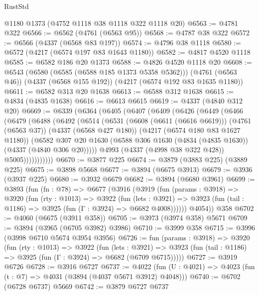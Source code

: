 \begin{lexlean}{RustStd}
\begin{coremodule}
{\begin{coremodule}
{{{{{{{{{{{{{{{{{{{{{{{{{{{{{{{{    @1180
    @1373
    (@4752 @1118 @38 @1118 @322 @1118 @20)
@6563 := @4781 @322
@6566 := @6562 (@4761 (@6563 @95))
@6568 := @4787 @38 @322
@6572 := @6566 (@4337 (@6568 @83 @197))
@6574 := @4796 @38 @1118
@6580 := @6572 (@4217 (@6574 @197 @83 @1643 @1180))
@6582 := @4817 @4520 @1118
@6585 := @6582 @186 @20 @1373
@6588 := @4826 @4520 @1118 @20
@6608 := @6543
    (@6580 (@6585 (@6588 @185 @1373 @5358 @5362)))
    (@4761 (@6563 @46))
    (@4337 (@6568 @155 @192))
    (@4217 (@6574 @192 @83 @1635 @1180))
@6611 := @6582 @313 @20 @1638
@6613 := @6588 @312 @1638
@6615 := @4834 (@4835 @1638)
@6616 := @6613 @6615
@6619 := @4337 (@4840 @312 @20)
@6669 := @6339
    (@6364
      (@6405
        (@6407
          (@6409
            (@6426
              (@6449
                (@6466
                  (@6479
                    (@6488
                      (@6492
                        (@6514
                          (@6531
                            (@6608 (@6611 (@6616 @6619)))
                            (@4761 (@6563 @37))
                            (@4337 (@6568 @427 @180))
                            (@4217 (@6574 @180 @83 @1627 @1180))
                            (@6582
                              @307
                              @20
                              @1630
                              (@6588 @306 @1630 (@4834 (@4835 @1630)) (@4337 (@4840 @306 @20)))))
                          @4993
                          (@4337 (@4998 @38 @322 @428))
                          @5005)))))))))))
@6670 := @3877 @225
@6674 := @3879 (@3883 @225) (@3889 @225)
@6675 := @3898 @5668
@6677 := @3894 (@6675 @3913)
@6679 := @3936 (@3937 @225)
@6680 := @3932 @6679
@6682 := @3894 (@6680 @3961)
@6699 := @3893
    (fun (fn : @78) =>
    @6677
      (@3916
        (@3919
          (fun (params : @3918) =>
          @3920
            (fun (rty : @1013) =>
            @3922
              (fun (lets : @3921) =>
              @3923 (fun (tail : @1186) => @3925 (fun (Γ : @3924) => @6682 @4008))))))
        @4054))
    @358
@6702 := @4060 (@6675 (@3911 @358))
@6705 := @3973 (@3974 @358) @5671
@6709 := @3894 (@3965 (@6705 @3982) @3986)
@6710 := @3999 @358
@6715 := @3996 (@3998 @6710 @5674 @3954 @3956)
@6726 := fun (params : @3918) =>
  @3920
    (fun (rty : @1013) =>
    @3922
      (fun (lets : @3921) =>
      @3923 (fun (tail : @1186) => @3925 (fun (Γ : @3924) => @6682 (@6709 @6715)))))
@6727 := @3919 @6726
@6728 := @3916 @6727
@6737 := @4022 (fun (U : @4021) => @4023 (fun (t : @7) => @4031 (@3894 (@4037 @5671 @3912) @4048)))
@6740 := @6702 (@6728 @6737) @5669
@6742 := @3879 @6727 @6737
}}}}}}}}}}}}}}}}}}}}}}}}}}}}}}}}
\end{coremodule}}
\end{coremodule}
\end{lexlean}
